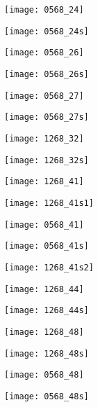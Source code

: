 \texttt{[image: 0568\_24]}

\texttt{[image: 0568\_24s]}

\texttt{[image: 0568\_26]}

\texttt{[image: 0568\_26s]}

\texttt{[image: 0568\_27]}

\texttt{[image: 0568\_27s]}

\texttt{[image: 1268\_32]}

\texttt{[image: 1268\_32s]}

\texttt{[image: 1268\_41]}

\texttt{[image: 1268\_41s1]}

\texttt{[image: 0568\_41]}

\texttt{[image: 0568\_41s]}

\texttt{[image: 1268\_41s2]}

\texttt{[image: 1268\_44]}

\texttt{[image: 1268\_44s]}


\texttt{[image: 1268\_48]}

\texttt{[image: 1268\_48s]}

\texttt{[image: 0568\_48]}

\texttt{[image: 0568\_48s]}





%


%

% 
%
%
%
%
%
%